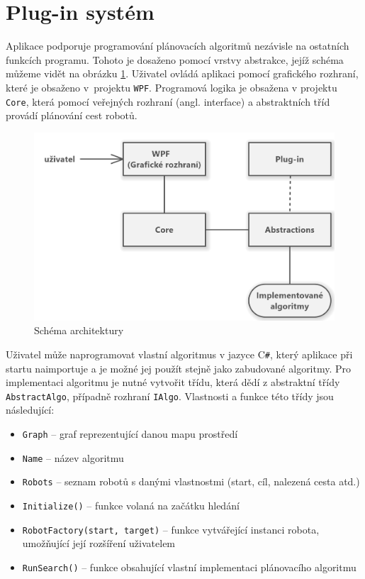 \section{Plug-in systém}\label{sec:plugins}
Aplikace podporuje programování plánovacích algoritmů nezávisle na ostatních funkcích programu. Tohoto je dosaženo pomocí vrstvy abstrakce, jejíž schéma můžeme vidět na obrázku \ref{obr:pluginsSchema}. Uživatel ovládá aplikaci pomocí grafického rozhraní, které je obsaženo v~projektu \texttt{WPF}. Programová logika je obsažena v projektu \texttt{Core}, která pomocí veřejných rozhraní (angl. interface) a abstraktních tříd provádí plánování cest robotů.

\begin{figure}[htb]
	\begin{center}
		\includegraphics*[width=15cm,keepaspectratio]{obr/pluginsSchema2}
	\end{center}
	\caption{Schéma architektury }
	\label{obr:pluginsSchema}
\end{figure}

Uživatel může naprogramovat vlastní algoritmus v jazyce C\texttt{\#}, který aplikace při startu naimportuje a je možné jej použít stejně jako zabudované algoritmy. Pro implementaci algoritmu je nutné vytvořit třídu, která dědí z abstraktní třídy \texttt{AbstractAlgo}, případně rozhraní \texttt{IAlgo}. Vlastnosti a funkce této třídy jsou následující:
\begin{itemize}
	\item \texttt{Graph} -- graf reprezentující danou mapu prostředí
	\item \texttt{Name} -- název algoritmu
	\item \texttt{Robots} -- seznam robotů s danými vlastnostmi (start, cíl, nalezená cesta atd.)
	\item \texttt{Initialize()} -- funkce volaná na začátku hledání
	\item \texttt{RobotFactory(start, target)} -- funkce vytvářející instanci robota, umožňující její rozšíření uživatelem
	\item \texttt{RunSearch()} -- funkce obsahující vlastní implementaci plánovacího algoritmu
\end{itemize}

